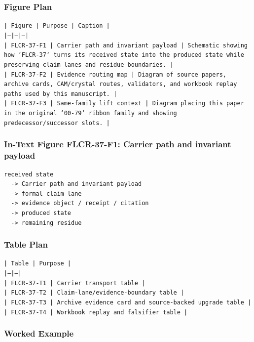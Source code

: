 \documentclass[11pt]{article}
\begin{document}
\subsubsection*{Figure Plan}

\noindent\texttt{| Figure | Purpose | Caption |}\\
\noindent\texttt{|---|---|---|}\\
\noindent\texttt{| FLCR-37-F1 | Carrier path and invariant payload | Schematic showing how `FLCR-37` turns its received state into the produced state while preserving claim lanes and residue boundaries. |}\\
\noindent\texttt{| FLCR-37-F2 | Evidence routing map | Diagram of source papers, archive cards, CAM/crystal routes, validators, and workbook replay paths used by this manuscript. |}\\
\noindent\texttt{| FLCR-37-F3 | Same-family lift context | Diagram placing this paper in the original `00-79` ribbon family and showing predecessor/successor slots. |}\\

\subsubsection*{In-Text Figure FLCR-37-F1: Carrier path and invariant payload}

\begin{verbatim}
received state
  -> Carrier path and invariant payload
  -> formal claim lane
  -> evidence object / receipt / citation
  -> produced state
  -> remaining residue
\end{verbatim}

\subsubsection*{Table Plan}

\noindent\texttt{| Table | Purpose |}\\
\noindent\texttt{|---|---|}\\
\noindent\texttt{| FLCR-37-T1 | Carrier transport table |}\\
\noindent\texttt{| FLCR-37-T2 | Claim-lane/evidence-boundary table |}\\
\noindent\texttt{| FLCR-37-T3 | Archive evidence card and source-backed upgrade table |}\\
\noindent\texttt{| FLCR-37-T4 | Workbook replay and falsifier table |}\\

\subsubsection*{Worked Example}
\end{document}
